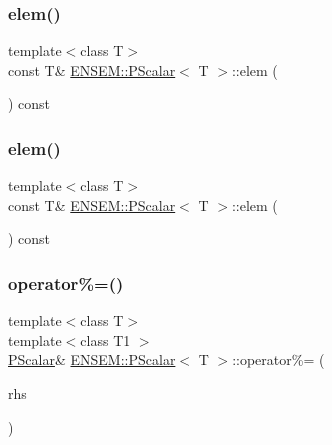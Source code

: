 \mbox{\label{classENSEM_1_1PScalar_ac20d84af6de415de7ad63292ad278542}} 
\subsubsection{\texorpdfstring{elem()}{elem()}\hspace{0.1cm}{\footnotesize\ttfamily [3/4]}}
{\footnotesize\ttfamily template$<$class T$>$ \\
const T\& \mbox{\hyperlink{classENSEM_1_1PScalar}{E\+N\+S\+E\+M\+::\+P\+Scalar}}$<$ T $>$\+::elem (\begin{DoxyParamCaption}{ }\end{DoxyParamCaption}) const\hspace{0.3cm}{\ttfamily [inline]}}

\mbox{\label{classENSEM_1_1PScalar_ac20d84af6de415de7ad63292ad278542}} 
\subsubsection{\texorpdfstring{elem()}{elem()}\hspace{0.1cm}{\footnotesize\ttfamily [4/4]}}
{\footnotesize\ttfamily template$<$class T$>$ \\
const T\& \mbox{\hyperlink{classENSEM_1_1PScalar}{E\+N\+S\+E\+M\+::\+P\+Scalar}}$<$ T $>$\+::elem (\begin{DoxyParamCaption}{ }\end{DoxyParamCaption}) const\hspace{0.3cm}{\ttfamily [inline]}}

\mbox{\label{classENSEM_1_1PScalar_ab583ff2667eba7d2bed2acbd3c15e43e}} 
\subsubsection{\texorpdfstring{operator\%=()}{operator\%=()}\hspace{0.1cm}{\footnotesize\ttfamily [1/2]}}
{\footnotesize\ttfamily template$<$class T$>$ \\
template$<$class T1 $>$ \\
\mbox{\hyperlink{classENSEM_1_1PScalar}{P\+Scalar}}\& \mbox{\hyperlink{classENSEM_1_1PScalar}{E\+N\+S\+E\+M\+::\+P\+Scalar}}$<$ T $>$\+::operator\%= (\begin{DoxyParamCaption}\item[{const \mbox{\hyperlink{classENSEM_1_1PScalar}{P\+Scalar}}$<$ T1 $>$ \&}]{rhs }\end{DoxyParamCaption})\hspace{0.3cm}{\ttfamily [inline]}}



